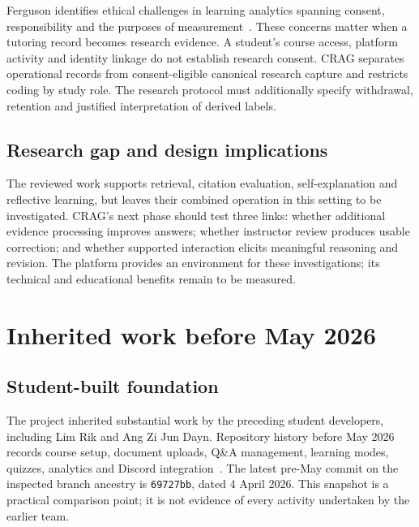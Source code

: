 \documentclass[11pt,a4paper]{article}
\begin{document}
Ferguson identifies ethical challenges in learning analytics spanning consent, responsibility and the purposes of measurement~\cite{ferguson}. These concerns matter when a tutoring record becomes research evidence. A student's course access, platform activity and identity linkage do not establish research consent. CRAG separates operational records from consent-eligible canonical research capture and restricts coding by study role. The research protocol must additionally specify withdrawal, retention and justified interpretation of derived labels.

\subsection{Research gap and design implications}
The reviewed work supports retrieval, citation evaluation, self-explanation and reflective learning, but leaves their combined operation in this setting to be investigated. CRAG's next phase should test three links: whether additional evidence processing improves answers; whether instructor review produces usable correction; and whether supported interaction elicits meaningful reasoning and revision. The platform provides an environment for these investigations; its technical and educational benefits remain to be measured.

\section{Inherited work before May 2026}
\subsection{Student-built foundation}
The project inherited substantial work by the preceding student developers, including Lim Rik and Ang Zi Jun Dayn. Repository history before May 2026 records course setup, document uploads, Q\&A management, learning modes, quizzes, analytics and Discord integration~\cite{repo}. The latest pre-May commit on the inspected branch ancestry is \texttt{69727bb}, dated 4 April 2026. This snapshot is a practical comparison point; it is not evidence of every activity undertaken by the earlier team.
\end{document}
